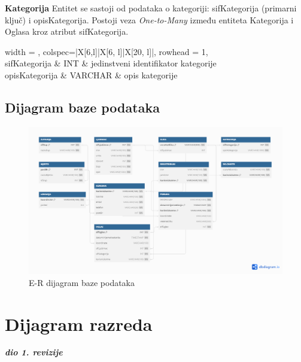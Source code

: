 				
				\noindent \textbf{Kategorija} Entitet se sastoji od podataka o kategoriji: sifKategorija (primarni ključ) i opisKategorija. Postoji veza \textit{One-to-Many} između entiteta Kategorija i Oglasa kroz atribut sifKategorija.
				
				
				\begin{longtblr}[
					label=none,
					entry=none
					]{
						width = \textwidth,
						colspec={|X[6,l]|X[6, l]|X[20, l]|}, 
						rowhead = 1,
					} %
					\hline {}	 \\ \hline[3pt]
					sifKategorija & INT	&  	jedinstveni identifikator kategorije  	\\ \hline
					opisKategorija	& VARCHAR & opis kategorije  	\\ \hline 
				\end{longtblr}
				
			
			\subsection{Dijagram baze podataka}
				\begin{figure}[h]
					\centering
					\includegraphics[width=1\textwidth]{slike/ERdiagram.png}
					\caption{E-R dijagram baze podataka}
					\label{fig:mesh1}
				\end{figure}
			
			\eject
			
			
		\section{Dijagram razreda}
			
			\textbf{\textit{dio 1. revizije}}\\

